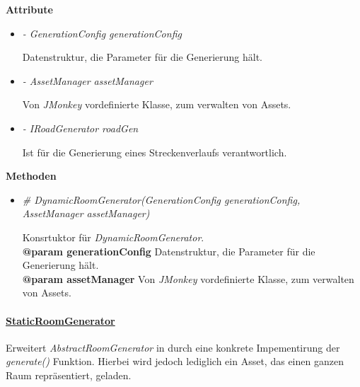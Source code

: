             \textbf{Attribute}
            \begin{itemize}
                \item  \textit{- GenerationConfig generationConfig} 
                    \begin{leftbar}[0.9\linewidth]
                        Datenstruktur, die Parameter für die Generierung hält.
                    \end{leftbar}
                
                \item  \textit{- AssetManager assetManager} 
                    \begin{leftbar}[0.9\linewidth]
                        Von \textit{JMonkey} vordefinierte Klasse, zum verwalten von Assets.
                    \end{leftbar}
                
                \item  \textit{- IRoadGenerator roadGen} 
                    \begin{leftbar}[0.9\linewidth]
                        Ist für die Generierung eines Streckenverlaufs verantwortlich.
                    \end{leftbar}
            \end{itemize}

            \textbf{Methoden}					
            \begin{itemize}
                \item  \textit{\# DynamicRoomGenerator(GenerationConfig generationConfig, AssetManager assetManager)}
                    \begin{leftbar}[0.9\linewidth]
                        Konsrtuktor für \textit{DynamicRoomGenerator}.\\
                        \textbf{@param generationConfig} Datenstruktur, die Parameter für die Generierung hält.\\
                        \textbf{@param assetManager}  Von \textit{JMonkey} vordefinierte Klasse, zum verwalten von Assets.
                    \end{leftbar} 
            \end{itemize}
        
        
        \pagebreak
        \paragraph{\underline{StaticRoomGenerator}} \mbox{}\par
            Erweitert \textit{AbstractRoomGenerator} in durch eine konkrete Impementirung der \textit{generate()} Funktion.
            Hierbei wird jedoch lediglich ein Asset, das einen ganzen Raum repräsentiert, geladen.\par
                
